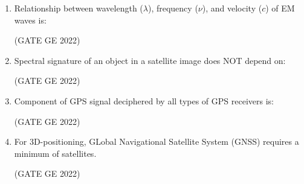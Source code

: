 \documentclass[journal,12pt,onecolumn]{IEEEtran}
\theoremstyle{remark}
\begin{document}
\begin{enumerate}
\item Relationship between wavelength ($\lambda$), frequency ($\nu$), and velocity ($c$) of EM waves is:

\hfill (GATE GE 2022)

\begin{enumerate}
\end{enumerate}

\item Spectral signature of an object in a satellite image does NOT depend on:

\hfill (GATE GE 2022)

\begin{enumerate}
\end{enumerate}

\item Component of GPS signal deciphered by all types of GPS receivers is:

\hfill (GATE GE 2022)

\begin{enumerate}
\end{enumerate}

\item For 3D-positioning, GLobal Navigational Satellite System (GNSS) requires a minimum of \makebox[1cm]{\hrulefill} satellites.

\hfill (GATE GE 2022)


\end{enumerate}
\end{document}
